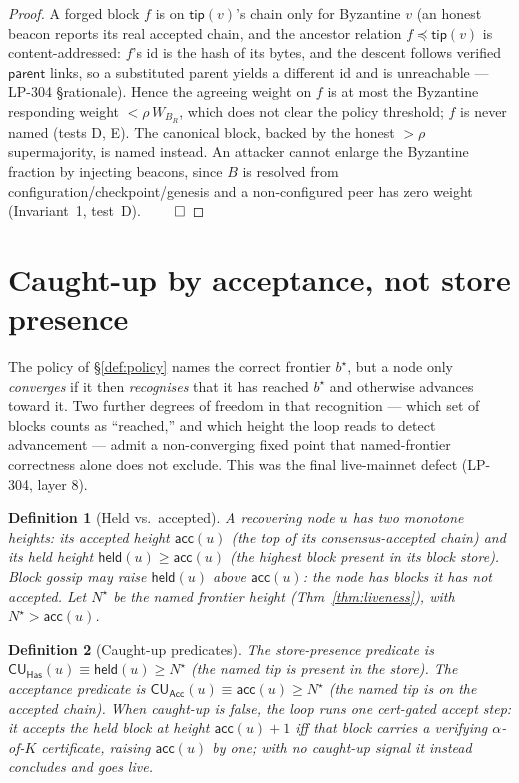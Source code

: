 \documentclass[11pt]{article}
\newtheorem{definition}{Definition}
\begin{document}
\begin{proof}
A forged block $f$ is on $\mathsf{tip}(v)$'s chain only for Byzantine $v$ (an honest beacon
reports its real accepted chain, and the ancestor relation $f\preceq\mathsf{tip}(v)$ is
content-addressed: $f$'s id is the hash of its bytes, and the descent follows verified
$\mathsf{parent}$ links, so a substituted parent yields a different id and is unreachable ---
LP-304 \S rationale). Hence the agreeing weight on $f$ is at most the Byzantine responding
weight $<\rho\,W_{B_R}$, which does not clear the policy threshold; $f$ is never named (tests
D, E). The canonical block, backed by the honest $>\rho$ supermajority, is named instead.
An attacker cannot enlarge the Byzantine fraction by injecting beacons, since $B$ is resolved
from configuration/checkpoint/genesis and a non-configured peer has zero weight
(Invariant~1, test~D). $\qed$
\end{proof}

\section{Caught-up by acceptance, not store presence}

The policy of \S\ref{def:policy} names the correct frontier $b^\star$, but a node only
\emph{converges} if it then \emph{recognises} that it has reached $b^\star$ and otherwise
advances toward it. Two further degrees of freedom in that recognition --- which set of blocks
counts as ``reached,'' and which height the loop reads to detect advancement --- admit a
non-converging fixed point that named-frontier correctness alone does not exclude. This was the
final live-mainnet defect (LP-304, layer 8).

\begin{definition}[Held vs.\ accepted]
A recovering node $u$ has two monotone heights: its \emph{accepted height} $\mathsf{acc}(u)$ (the
top of its consensus-accepted chain) and its \emph{held height} $\mathsf{held}(u)\ge\mathsf{acc}(u)$
(the highest block present in its block store). Block gossip may raise $\mathsf{held}(u)$ above
$\mathsf{acc}(u)$: the node \emph{has} blocks it has not \emph{accepted}. Let $N^\star$ be the named
frontier height (Thm~\ref{thm:liveness}), with $N^\star>\mathsf{acc}(u)$.
\end{definition}

\begin{definition}[Caught-up predicates]
The \emph{store-presence} predicate is
$\mathsf{CU}_{\mathsf{Has}}(u)\equiv \mathsf{held}(u)\ge N^\star$ (the named tip is present in the
store). The \emph{acceptance} predicate is
$\mathsf{CU}_{\mathsf{Acc}}(u)\equiv \mathsf{acc}(u)\ge N^\star$ (the named tip is on the accepted
chain). When caught-up is false, the loop runs one \emph{cert-gated accept step}: it accepts the
held block at height $\mathsf{acc}(u)+1$ iff that block carries a verifying $\alpha$-of-$K$
certificate, raising $\mathsf{acc}(u)$ by one; with no caught-up signal it instead concludes and
goes live.
\end{definition}
\end{document}
